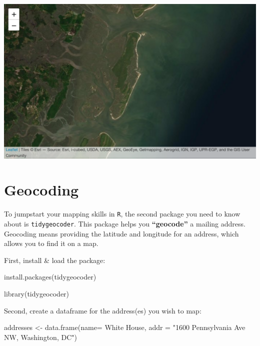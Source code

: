 \documentclass[
]{book}
\newenvironment{Shaded}{\begin{snugshade}}{\end{snugshade}}
\newcommand{\AttributeTok}[1]{\textcolor[rgb]{0.77,0.63,0.00}{#1}}
\newcommand{\FunctionTok}[1]{\textcolor[rgb]{0.00,0.00,0.00}{#1}}
\newcommand{\NormalTok}[1]{#1}
\newcommand{\OtherTok}[1]{\textcolor[rgb]{0.56,0.35,0.01}{#1}}
\newcommand{\StringTok}[1]{\textcolor[rgb]{0.31,0.60,0.02}{#1}}
\begin{document}
\includegraphics{figures/unnamed-chunk-220-1.pdf}

\hypertarget{geocoding}{%
\section*{Geocoding}\label{geocoding}}

To jumpstart your mapping skills in \texttt{R}, the second package you need to know about is \texttt{tidygeocoder}. This package helps you \textbf{``geocode''} a mailing address. Geocoding means providing the latitude and longitude for an address, which allows you to find it on a map.

First, install \& load the package:

\begin{Shaded}
\begin{Highlighting}[]
\FunctionTok{install.packages}\NormalTok{(}\StringTok{\textquotesingle{}tidygeocoder\textquotesingle{}}\NormalTok{)}
\end{Highlighting}
\end{Shaded}

\begin{Shaded}
\begin{Highlighting}[]
\FunctionTok{library}\NormalTok{(tidygeocoder)}
\end{Highlighting}
\end{Shaded}

Second, create a dataframe for the address(es) you wish to map:

\begin{Shaded}
\begin{Highlighting}[]
\NormalTok{addresses }\OtherTok{\textless{}{-}} \FunctionTok{data.frame}\NormalTok{(}\AttributeTok{name=} \StringTok{\textquotesingle{}White House\textquotesingle{}}\NormalTok{, }
                        \AttributeTok{addr =} \StringTok{"1600 Pennsylvania Ave NW, Washington, DC"}\NormalTok{)}
\end{Highlighting}
\end{Shaded}
\end{document}
